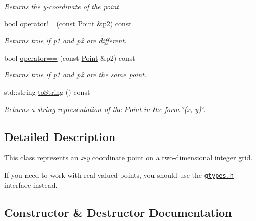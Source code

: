 \begin{DoxyCompactItemize}
\begin{DoxyCompactList}\small\item\em Returns the {\itshape y}-\/coordinate of the point. \end{DoxyCompactList}\item 
bool \mbox{\hyperlink{classPoint_ad62a7cee20e8e65bdf44b395d3df3e1b}{operator!=}} (const \mbox{\hyperlink{classPoint}{Point}} \&p2) const
\begin{DoxyCompactList}\small\item\em Returns {\ttfamily true} if {\ttfamily p1} and {\ttfamily p2} are different. \end{DoxyCompactList}\item 
bool \mbox{\hyperlink{classPoint_a66555fdca04ab3b9217ba2ed259be2b9}{operator==}} (const \mbox{\hyperlink{classPoint}{Point}} \&p2) const
\begin{DoxyCompactList}\small\item\em Returns {\ttfamily true} if {\ttfamily p1} and {\ttfamily p2} are the same point. \end{DoxyCompactList}\item 
std\+::string \mbox{\hyperlink{classPoint_a1fe5121d6528fdea3f243321b3fa3a49}{to\+String}} () const
\begin{DoxyCompactList}\small\item\em Returns a string representation of the {\ttfamily \mbox{\hyperlink{classPoint}{Point}}} in the form {\ttfamily \char`\"{}(x, y)\char`\"{}}. \end{DoxyCompactList}\end{DoxyCompactItemize}


\subsection{Detailed Description}
This class represents an {\itshape x}-\/{\itshape y} coordinate point on a two-\/dimensional integer grid. 

If you need to work with real-\/valued points, you should use the \href{gtypes.html}{\tt {\ttfamily gtypes.\+h}} interface instead. 

\subsection{Constructor \& Destructor Documentation}
\mbox{\label{classPoint_ae08c5f0c5b4c75a3e0f33dada5f2fcba}} 
